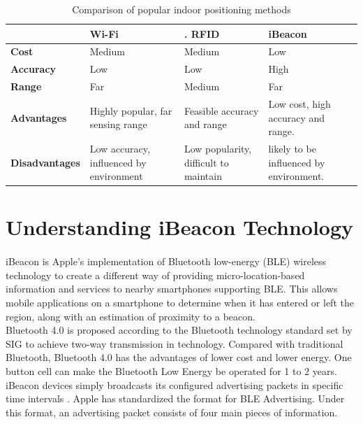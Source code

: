 \documentclass[12pt]{article}
\begin{document}
\begin{table}%
    \centering
    \caption{Comparison of popular indoor positioning methods} 
    \label{my-label2}
       \begin{tabular}{|p{30mm}|p{30mm}|p{30mm}|p{30mm}|}
 \hline
  & \textbf{Wi-Fi }&.        \textbf{RFID} &  \textbf{iBeacon} \\ [0.5ex] 
 \hline\hline
 \textbf{Cost} & Medium & Medium & Low \\ 
 \hline
 \textbf{Accuracy} & Low & Low & High \\
 \hline
 \textbf{Range} & Far & Medium & Far \\
 \hline
 \textbf{Advantages} & Highly popular, far sensing range & Feasible accuracy and range & Low cost, high accuracy and range. \\
 \hline
 \textbf{Disadvantages} & Low accuracy, influenced by environment & Low popularity, difficult to maintain & likely to be influenced by environment. \\ [1ex] 
 \hline
    \end{tabular}
\end{table}

\section{Understanding iBeacon Technology}
\label{iBeacon-tech}
\paragraph{}iBeacon is Apple’s implementation of Bluetooth low-energy (BLE) wireless technology to create a different way of providing micro-location-based information and services to nearby smartphones supporting BLE. This allows mobile applications on a smartphone to determine when it has entered or left the region, along with an estimation of proximity to a beacon. \\

Bluetooth 4.0 is proposed according to the Bluetooth technology standard set by SIG to achieve two-way transmission in technology. Compared with traditional Bluetooth, Bluetooth 4.0 has the advantages of lower cost and lower energy. One button cell can make the Bluetooth Low Energy be operated for 1 to 2 years. \cite{taiwan} \\

iBeacon devices simply broadcasts its configured advertising packets in specific time intervals \cite{one}. Apple has standardized the format for BLE Advertising. Under this format, an advertising packet consists of four main pieces of information. \\
\end{document}
